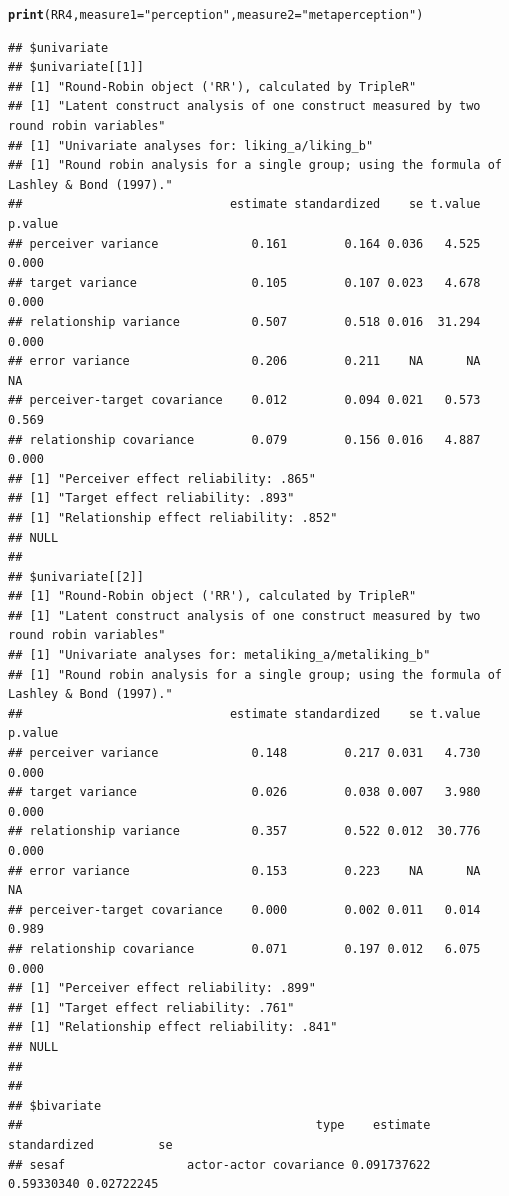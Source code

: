 \documentclass[a4paper]{article}\usepackage[]{graphicx}\usepackage[]{color}
\makeatletter
\newcommand{\hlstr}[1]{\textcolor[rgb]{0.192,0.494,0.8}{#1}}%
\newcommand{\hlstd}[1]{\textcolor[rgb]{0.345,0.345,0.345}{#1}}%
\newcommand{\hlkwc}[1]{\textcolor[rgb]{0.333,0.667,0.333}{#1}}%
\newcommand{\hlkwd}[1]{\textcolor[rgb]{0.737,0.353,0.396}{\textbf{#1}}}%
\newenvironment{kframe}{%
 \def\at@end@of@kframe{}%
 \ifinner\ifhmode%
  \def\at@end@of@kframe{\end{minipage}}%
  \begin{minipage}{\columnwidth}%
 \fi\fi%
 \def\FrameCommand##1{\hskip\@totalleftmargin \hskip-\fboxsep
 \colorbox{shadecolor}{##1}\hskip-\fboxsep
     \hskip-\linewidth \hskip-\@totalleftmargin \hskip\columnwidth}%
 \MakeFramed {\advance\hsize-\width
   \@totalleftmargin\z@ \linewidth\hsize
   \@setminipage}}%
 {\par\unskip\endMakeFramed%
 \at@end@of@kframe}
\newenvironment{knitrout}{}{} %
\makeatother
\begin{document}
\begin{knitrout}\small
{}\color{fgcolor}\begin{kframe}
\begin{alltt}
\hlkwd{print}\hlstd{(RR4,} \hlkwc{measure1} \hlstd{=} \hlstr{"perception"}\hlstd{,} \hlkwc{measure2} \hlstd{=} \hlstr{"metaperception"}\hlstd{)}
\end{alltt}
\begin{verbatim}
## $univariate
## $univariate[[1]]
## [1] "Round-Robin object ('RR'), calculated by TripleR"
## [1] "Latent construct analysis of one construct measured by two round robin variables"
## [1] "Univariate analyses for: liking_a/liking_b"
## [1] "Round robin analysis for a single group; using the formula of Lashley & Bond (1997)."
##                             estimate standardized    se t.value p.value
## perceiver variance             0.161        0.164 0.036   4.525   0.000
## target variance                0.105        0.107 0.023   4.678   0.000
## relationship variance          0.507        0.518 0.016  31.294   0.000
## error variance                 0.206        0.211    NA      NA      NA
## perceiver-target covariance    0.012        0.094 0.021   0.573   0.569
## relationship covariance        0.079        0.156 0.016   4.887   0.000
## [1] "Perceiver effect reliability: .865"
## [1] "Target effect reliability: .893"
## [1] "Relationship effect reliability: .852"
## NULL
## 
## $univariate[[2]]
## [1] "Round-Robin object ('RR'), calculated by TripleR"
## [1] "Latent construct analysis of one construct measured by two round robin variables"
## [1] "Univariate analyses for: metaliking_a/metaliking_b"
## [1] "Round robin analysis for a single group; using the formula of Lashley & Bond (1997)."
##                             estimate standardized    se t.value p.value
## perceiver variance             0.148        0.217 0.031   4.730   0.000
## target variance                0.026        0.038 0.007   3.980   0.000
## relationship variance          0.357        0.522 0.012  30.776   0.000
## error variance                 0.153        0.223    NA      NA      NA
## perceiver-target covariance    0.000        0.002 0.011   0.014   0.989
## relationship covariance        0.071        0.197 0.012   6.075   0.000
## [1] "Perceiver effect reliability: .899"
## [1] "Target effect reliability: .761"
## [1] "Relationship effect reliability: .841"
## NULL
## 
## 
## $bivariate
##                                         type    estimate standardized         se
## sesaf                 actor-actor covariance 0.091737622   0.59330340 0.02722245

\end{verbatim}
\end{kframe}
\end{knitrout}
\end{document}
